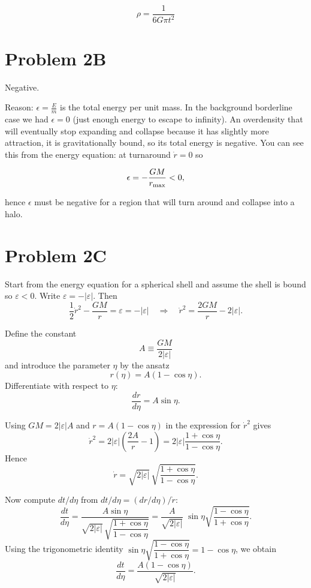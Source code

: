 \begin{equation}
  \boxed{\rho =  \frac{1}{6G \pi t^2}}
\end{equation}


\section*{Problem 2B}

Negative.

 
Reason: $\epsilon = \frac{E}{m}$ is the total energy per unit mass. 
In the background borderline case we had $\epsilon = 0$ 
(just enough energy to escape to infinity). 
An overdensity that will eventually stop expanding and collapse because it has slightly more attraction, it is gravitationally bound, so its total energy is negative. 
You can see this from the energy equation: at turnaround $\dot{r} = 0$ so

\begin{equation}
    \epsilon = -\frac{GM}{r_{\rm max}} < 0,
\end{equation}

hence $\epsilon$ must be negative for a region that will turn around and collapse into a halo.



\section*{Problem 2C}

Start from the energy equation for a spherical shell and assume the shell is bound so
\(\varepsilon<0\). Write \(\varepsilon=-|\varepsilon|\). Then
\[
\frac{1}{2}\dot r^{2}-\frac{GM}{r}=\varepsilon=-|\varepsilon|
\quad\Longrightarrow\quad
\dot r^{2}=\frac{2GM}{r}-2|\varepsilon|.
\]

Define the constant
\[
A\equiv\frac{GM}{2|\varepsilon|}
\]
and introduce the parameter \(\eta\) by the ansatz
\[
r(\eta)=A(1-\cos\eta).
\]
Differentiate with respect to \(\eta\):
\[
\frac{dr}{d\eta}=A\sin\eta.
\]

Using \(GM=2|\varepsilon|A\) and \(r=A(1-\cos\eta)\) in the expression for \(\dot r^{2}\) gives
\[
\dot r^{2}=2|\varepsilon|\left(\frac{2A}{r}-1\right)
=2|\varepsilon|\frac{1+\cos\eta}{1-\cos\eta}.
\]
Hence
\[
\dot r=\sqrt{2|\varepsilon|}\,\sqrt{\frac{1+\cos\eta}{1-\cos\eta}}.
\]

Now compute \(dt/d\eta\) from \(dt/d\eta=(dr/d\eta)/\dot r\):
\[
\frac{dt}{d\eta}
=\frac{A\sin\eta}{\sqrt{2|\varepsilon|}\,\sqrt{\dfrac{1+\cos\eta}{1-\cos\eta}}}
=\frac{A}{\sqrt{2|\varepsilon|}}\; \sin\eta\sqrt{\frac{1-\cos\eta}{1+\cos\eta}}.
\]
Using the trigonometric identity
\(\sin\eta\sqrt{\dfrac{1-\cos\eta}{1+\cos\eta}}=1-\cos\eta\),
we obtain
\[
\frac{dt}{d\eta}=\frac{A(1-\cos\eta)}{\sqrt{2|\varepsilon|}}.
\]


